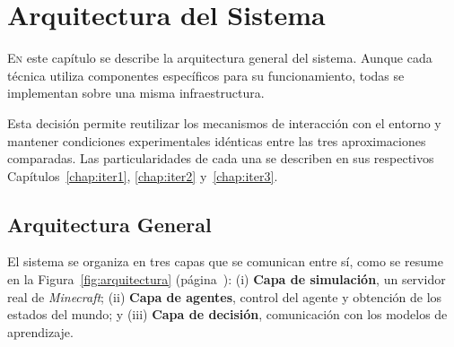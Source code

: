\chapter{Arquitectura del Sistema}
\label{chap:arquitectura}

\lettrine{E}{n} este capítulo se describe la arquitectura general del sistema.
Aunque cada técnica utiliza componentes específicos para su funcionamiento,
todas se implementan sobre una misma infraestructura.

Esta decisión permite reutilizar los mecanismos de interacción con el entorno y mantener
condiciones experimentales idénticas entre las tres aproximaciones comparadas.
Las particularidades de cada una se describen en sus respectivos
Capítulos~\ref{chap:iter1}, \ref{chap:iter2} y~\ref{chap:iter3}.

\section{Arquitectura General}
El sistema se organiza en tres capas que se comunican entre sí, como se resume en
la Figura~\ref{fig:arquitectura} (página~\pageref{fig:arquitectura}):
(i) \textbf{Capa de simulación}, un servidor real de \textit{Minecraft};
(ii) \textbf{Capa de agentes}, control del agente y obtención de los estados del mundo;
y (iii) \textbf{Capa de decisión}, comunicación con los modelos de aprendizaje.

